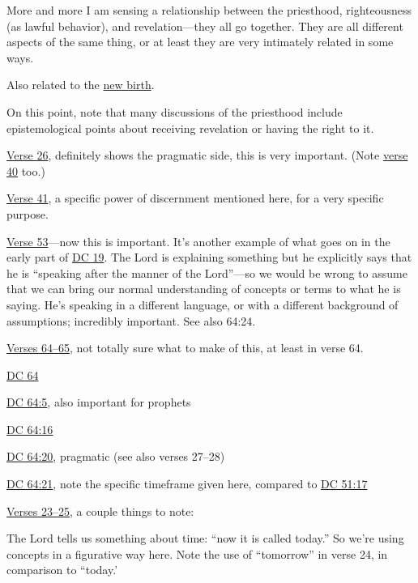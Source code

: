 \begin{compactdesc}
\begin{compactitem}
\begin{compactitem}
							\item More and more I am sensing a relationship between the priesthood, righteousness (as lawful behavior), and revelation---they all go together. They are all different aspects of the same thing, or at least they are very intimately related in some ways.
							\item Also related to the \hyperref[NEWBIRTH]{new birth}.
							\item On this point, note that many discussions of the priesthood include epistemological points about receiving revelation or having the right to it.
						\end{compactitem}
					\item \hyperref[DC63-26]{Verse 26}, definitely shows the pragmatic side, this is very important. (Note \hyperref[DC63-40]{verse 40} too.)
					\item \hyperref[DC63-41]{Verse 41}, a specific power of discernment mentioned here, for a very specific purpose.
					\item \hyperref[DC63-53]{Verse 53}---now this is important. It's another example of what goes on in the early part of \hyperref[DC19]{DC 19}. The Lord is explaining something but he explicitly says that he is ``speaking after the manner of the Lord''---so we would be wrong to assume that we can bring our normal understanding of concepts or terms to what he is saying. He's speaking in a different language, or with a different background of assumptions; incredibly important. See also 64:24.
					\item \hyperref[DC63-64]{Verses 64--65}, not totally sure what to make of this, at least in verse 64.
				\end{compactitem}
			\item \hyperref[DC64]{DC 64}
				\begin{compactitem}
					\item \hyperref[DC64-5]{DC 64:5}, also important for prophets
					\item \hyperref[DC64-16]{DC 64:16}
					\item \hyperref[DC64-20]{DC 64:20}, pragmatic (see also verses 27--28)
					\item \hyperref[DC64-21]{DC 64:21}, note the specific timeframe given here, compared to \hyperref[DC51-17]{DC 51:17}
					\item \hyperref[DC64-23]{Verses 23--25}, a couple things to note:
						\begin{compactitem}
							\item The Lord tells us something about time: ``now it is called today.'' So we're using concepts in a figurative way here. Note the use of ``tomorrow'' in verse 24, in comparison to ``today.'

\end{compactitem}
\end{compactitem}
\end{compactdesc}
